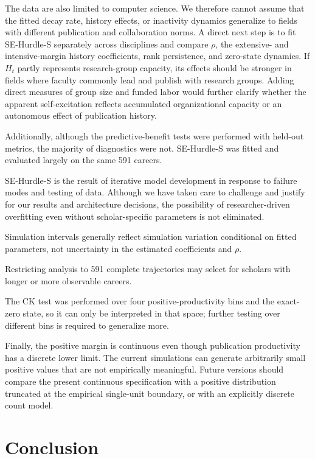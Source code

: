 \documentclass[twocolumn, letterpaper]{article}
\begin{document}
The data are also limited to computer science. We therefore cannot assume that the fitted decay rate, history effects, or inactivity dynamics generalize to fields with different publication and collaboration norms. A direct next step is to fit SE-Hurdle-S separately across disciplines and compare $\rho$, the extensive- and intensive-margin history coefficients, rank persistence, and zero-state dynamics. If $H_t$ partly represents research-group capacity, its effects should be stronger in fields where faculty commonly lead and publish with research groups. Adding direct measures of group size and funded labor would further clarify whether the apparent self-excitation reflects accumulated organizational capacity or an autonomous effect of publication history.

Additionally, although the predictive-benefit tests were performed with held-out metrics, the majority of diagnostics were not. SE-Hurdle-S was fitted and evaluated largely on the same 591 careers.

SE-Hurdle-S is the result of iterative model development in response to failure modes and testing of data. Although we have taken care to challenge and justify for our results and architecture decisions, the possibility of researcher-driven overfitting even without scholar-specific parameters is not eliminated.

Simulation intervals generally reflect simulation variation conditional on fitted parameters, not uncertainty in the estimated coefficients and $\rho$.

Restricting analysis to 591 complete trajectories may select for scholars with longer or more observable careers.

The CK test was performed over four positive-productivity bins and the exact-zero state, so it can only be interpreted in that space; further testing over different bins is required to generalize more.

Finally, the positive margin is continuous even though publication productivity has a discrete lower limit. The current simulations can generate arbitrarily small positive values that are not empirically meaningful. Future versions should compare the present continuous specification with a positive distribution truncated at the empirical single-unit boundary, or with an explicitly discrete count model.

\section{Conclusion}
\label{sec:conclusion}
\end{document}

